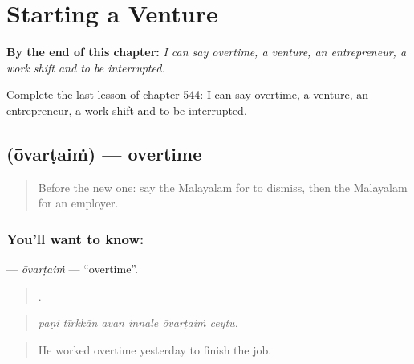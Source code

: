 
\chapter{Starting a Venture}
\label{ch:ml-starting-a-venture}

\begin{chapteropening}
\textbf{By the end of this chapter:} \emph{I can say overtime, a venture, an entrepreneur, a work shift and to be interrupted.}

Complete the last lesson of chapter 544: I can say overtime, a venture, an entrepreneur, a work shift and to be interrupted.
\end{chapteropening}

\section[\texorpdfstring{\ml{ഓവർടൈം} (ōvarṭaiṁ)}{ഓവർടൈം (ōvarṭaiṁ)}]{ (ōvarṭaiṁ) — overtime}

\label{lesson:ML-C544-ovartaim}



\begin{quote}
Before the new one: say the Malayalam for to dismiss, then the Malayalam for an employer.
\end{quote}

\subsection*{You'll want to know: }
\textbf{} — \emph{ōvarṭaiṁ} — \textquotedblleft{}overtime\textquotedblright{}.

\begin{quote}
     .
\end{quote}

\begin{quote}
\emph{paṇi tīrkkān avan innale ōvarṭaiṁ ceytu.}
\end{quote}

\begin{quote}
He worked overtime yesterday to finish the job.
\end{quote}


